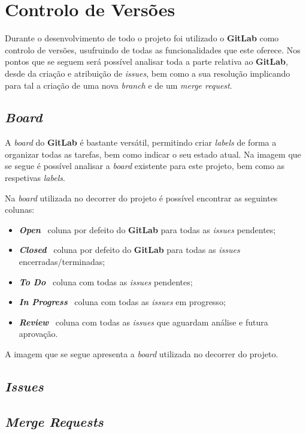 \chapter{Controlo de Versões}

Durante o desenvolvimento de todo o projeto foi utilizado o \textbf{GitLab} como controlo de versões, usufruindo de todas as funcionalidades que este oferece. Nos pontos que se seguem será possível analisar toda a parte relativa ao \textbf{GitLab}, desde da criação e atribuição de \textit{issues}, bem como a sua resolução implicando para tal a criação de uma nova \textit{branch} e de um \textit{merge request}.

\section{\textit{Board}}

A \textit{board} do \textbf{GitLab} é bastante versátil, permitindo criar \textit{labels} de forma a organizar todas as tarefas, bem como indicar o seu estado atual. Na imagem que se segue é possível analisar a \textit{board} existente para este projeto, bem como as respetivas \textit{labels}.

Na \textit{board} utilizada no decorrer do projeto é possível encontrar as seguintes colunas:

\begin{itemize}
	\item \textbf{\textit{Open}} \textemdash~coluna por defeito do \textbf{GitLab} para todas as \textit{issues} pendentes;
	\item \textbf{\textit{Closed}} \textemdash~coluna por defeito do \textbf{GitLab} para todas as \textit{issues} encerradas/terminadas;
	\item \textbf{\textit{To Do}} \textemdash~coluna com todas as \textit{issues} pendentes;
	\item \textbf{\textit{In Progress}} \textemdash~coluna com todas as \textit{issues} em progresso;
	\item \textbf{\textit{Review}} \textemdash~coluna com todas as \textit{issues} que aguardam análise e futura aprovação.
\end{itemize}

A imagem que se segue apresenta a \textit{board} utilizada no decorrer do projeto.

\section{\textit{Issues}}

\section{\textit{Merge Requests}}